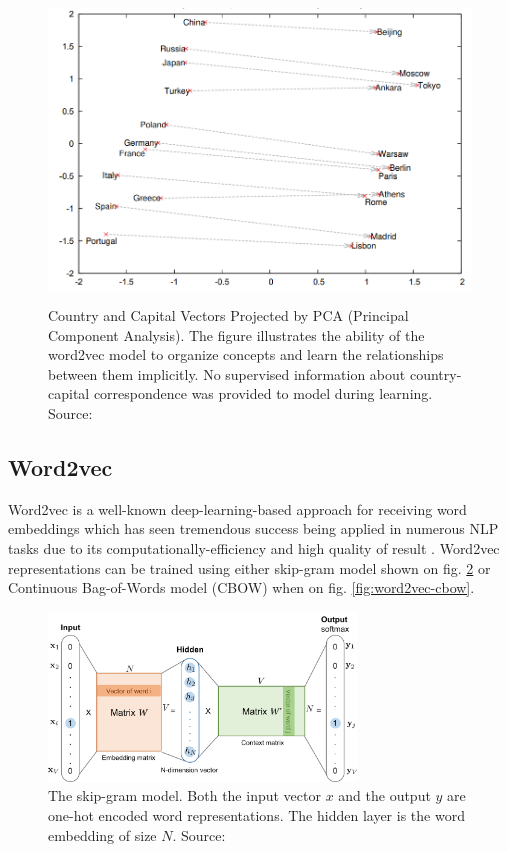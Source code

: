 \begin{figure}[h]
    \centering
    \includegraphics[height=8cm]{Images/word2vec-property.png}
    \caption{Country and Capital Vectors Projected by PCA (Principal Component Analysis). The figure illustrates the ability of the word2vec model to organize concepts and learn the relationships between them implicitly. No supervised information about country-capital correspondence was provided to model during learning. Source: \citep{Mikolov-NIPS2013}}
    \label{fig:word2vec-property}
\end{figure} 


\subsection{Word2vec} 
\label{sec:word2vec}
Word2vec is a well-known deep-learning-based approach for receiving word embeddings which has seen tremendous success being applied in numerous NLP tasks due to its computationally-efficiency and high quality of result \cite{Mikolov-NIPS2013}. Word2vec representations can be trained using either skip-gram model \citep{Mikolov-NIPS2013} shown on fig. \ref{fig:word2vec-skip-gram}  or Continuous Bag-of-Words model (CBOW) \citep{Mikolov-ICLR2013} when on fig. \ref{fig:word2vec-cbow}.

\begin{figure}[h]
    \centering
    \includegraphics[height=4.5cm]{Images/word2vec-skip-gram.png}
    \caption{The skip-gram model. Both the input vector $x$ and the output $y$ are one-hot encoded word representations. The hidden layer is the word embedding of size $N$. Source: \citep{Weng-2017}}
    \label{fig:word2vec-skip-gram}
\end{figure} 

